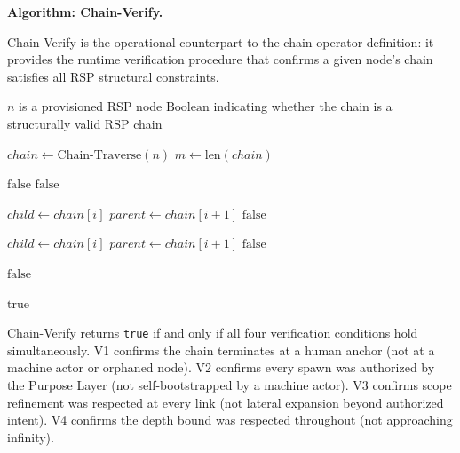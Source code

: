 \bigskip
\noindent\textbf{Algorithm: Chain-Verify.}

Chain-Verify is the operational counterpart to the chain operator definition: it provides the runtime verification procedure that confirms a given node's chain satisfies all RSP structural constraints.

\begin{algorithm}
\caption{Chain-Verify($n$) --- Verify the authorization chain from node $n$ to human anchor}
\label{alg:chain-verify}
\begin{algorithmic}[1]
\REQUIRE $n$ is a provisioned RSP node
\ENSURE $\text{Boolean}$ indicating whether the chain is a structurally valid RSP chain

\STATE $chain \leftarrow \text{Chain-Traverse}(n)$
\STATE $m \leftarrow \text{len}(chain)$

\STATE {}
    \STATE \RETURN $\text{false}$ 
\ENDIF
{}
    \STATE \RETURN $\text{false}$ 
\ENDIF

\STATE {}
    \STATE $child \leftarrow chain[i]$
    \STATE $parent \leftarrow chain[i+1]$
        \STATE \RETURN $\text{false}$ 
    \ENDIF
\ENDFOR

\STATE {}
    \STATE $child \leftarrow chain[i]$
    \STATE $parent \leftarrow chain[i+1]$
        \STATE \RETURN $\text{false}$ 
    \ENDIF
\ENDFOR

\STATE {}
        \STATE \RETURN $\text{false}$ 
    \ENDIF
\ENDFOR

\RETURN $\text{true}$
\end{algorithmic}
\end{algorithm}

Chain-Verify returns \texttt{true} if and only if all four verification conditions hold simultaneously. V1 confirms the chain terminates at a human anchor (not at a machine actor or orphaned node). V2 confirms every spawn was authorized by the Purpose Layer (not self-bootstrapped by a machine actor). V3 confirms scope refinement was respected at every link (not lateral expansion beyond authorized intent). V4 confirms the depth bound was respected throughout (not approaching infinity).

